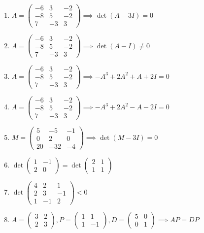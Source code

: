 \documentclass[11pt,a4paper]{article}
\begin{document}
\begin{enumerate}
\item $\displaystyle A = \begin{pmatrix} -6 & 3 & -2 \\ -8 & 5 & -2 \\ 7 & -3 & 3 \end{pmatrix} \implies \det\left( A - 3I \right) = 0$
\item $\displaystyle A = \begin{pmatrix} -6 & 3 & -2 \\ -8 & 5 & -2 \\ 7 & -3 & 3 \end{pmatrix} \implies \det\left( A - I \right) \neq 0$
\item $\displaystyle A = \begin{pmatrix} -6 & 3 & -2 \\ -8 & 5 & -2 \\ 7 & -3 & 3 \end{pmatrix} \implies -A^{3} + 2A^{2} + A + 2I = 0$
\item $\displaystyle A = \begin{pmatrix} -6 & 3 & -2 \\ -8 & 5 & -2 \\ 7 & -3 & 3 \end{pmatrix} \implies -A^{3} + 2A^{2} - A - 2I = 0$
\item $\displaystyle M = \begin{pmatrix} 5 & -5 & -1 \\ 0 & 2 & 0 \\ 20 & -32 & -4 \end{pmatrix} \implies \det\left( M - 3I \right) = 0$
\item $\displaystyle \det \begin{pmatrix} 1 & -1 \\ 2 & 0 \end{pmatrix} = \det \begin{pmatrix} 2 & 1 \\ 1 & 1 \end{pmatrix}$
\item $\displaystyle \det \begin{pmatrix} 4 & 2 & 1 \\ 2 & 3 & -1 \\ 1 & -1 & 2 \end{pmatrix} < 0$
\item $\displaystyle A = \begin{pmatrix} 3 & 2 \\ 2 & 3 \end{pmatrix}, P = \begin{pmatrix} 1 & 1 \\ 1 & -1 \end{pmatrix}, D = \begin{pmatrix} 5 & 0 \\ 0 & 1 \end{pmatrix} \implies A P = D P$

\end{enumerate}
\end{document}
